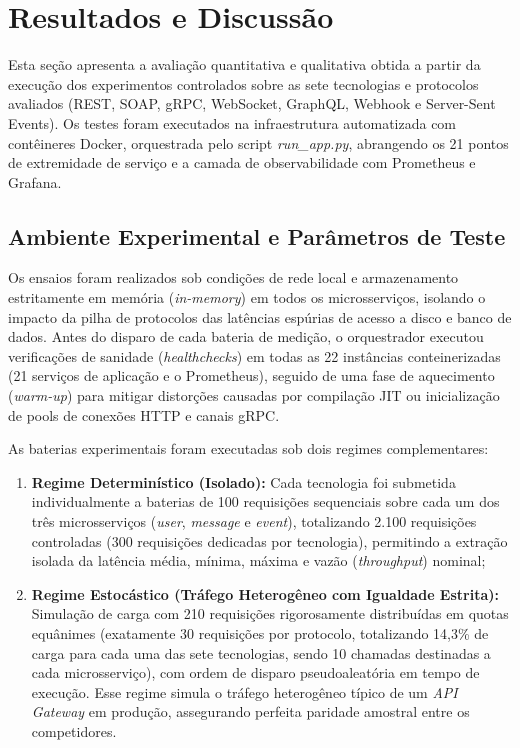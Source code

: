 \documentclass[a4paper,12pt]{article}
\begin{document}
\begin{itemize}
\end{itemize}

\section{Resultados e Discussão}
\label{sec:resultados}

Esta seção apresenta a avaliação quantitativa e qualitativa obtida a partir da execução dos experimentos controlados sobre as sete tecnologias e protocolos avaliados (REST, SOAP, gRPC, WebSocket, GraphQL, Webhook e Server-Sent Events). Os testes foram executados na infraestrutura automatizada com contêineres Docker, orquestrada pelo script \textit{run\_app.py}, abrangendo os 21 pontos de extremidade de serviço e a camada de observabilidade com Prometheus e Grafana.

\subsection{Ambiente Experimental e Parâmetros de Teste}

Os ensaios foram realizados sob condições de rede local e armazenamento estritamente em memória (\textit{in-memory}) em todos os microsserviços, isolando o impacto da pilha de protocolos das latências espúrias de acesso a disco e banco de dados. Antes do disparo de cada bateria de medição, o orquestrador executou verificações de sanidade (\textit{healthchecks}) em todas as 22 instâncias conteinerizadas (21 serviços de aplicação e o Prometheus), seguido de uma fase de aquecimento (\textit{warm-up}) para mitigar distorções causadas por compilação JIT ou inicialização de pools de conexões HTTP e canais gRPC.

As baterias experimentais foram executadas sob dois regimes complementares:
\begin{enumerate}
    \item \textbf{Regime Determinístico (Isolado):} Cada tecnologia foi submetida individualmente a baterias de 100 requisições sequenciais sobre cada um dos três microsserviços (\textit{user}, \textit{message} e \textit{event}), totalizando 2.100 requisições controladas (300 requisições dedicadas por tecnologia), permitindo a extração isolada da latência média, mínima, máxima e vazão (\textit{throughput}) nominal;
    \item \textbf{Regime Estocástico (Tráfego Heterogêneo com Igualdade Estrita):} Simulação de carga com 210 requisições rigorosamente distribuídas em quotas equânimes (exatamente 30 requisições por protocolo, totalizando 14,3\% de carga para cada uma das sete tecnologias, sendo 10 chamadas destinadas a cada microsserviço), com ordem de disparo pseudoaleatória em tempo de execução. Esse regime simula o tráfego heterogêneo típico de um \textit{API Gateway} em produção, assegurando perfeita paridade amostral entre os competidores.
\end{enumerate}
\end{document}
